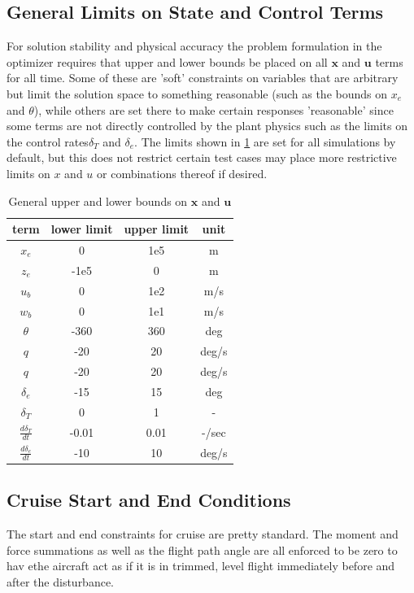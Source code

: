 \documentclass{article}
\begin{document}
\subsection{General Limits on State and Control Terms} \label{sec:limits}
For solution stability and physical accuracy the problem formulation in the optimizer requires that upper and lower bounds be placed on all  $\mathbf{x}$ and $\mathbf{u}$ terms for all time. 
Some of these are 'soft' constraints on variables that are arbitrary but limit the solution space to something reasonable (such as the bounds on $x_e$ and $\theta$),  while others are set there to make certain responses 'reasonable' since some terms are not directly controlled by the plant physics such as the limits on the control rates$\delta_T$ and $\delta_e$. 
The limits shown in \cref{tbl:general-control-limits} are set for all simulations by default, but this does not restrict certain test cases may place more restrictive limits on $x$ and $u$ or combinations thereof if desired. 
\begin{table}[!h]
	\centering
	\caption{General upper and lower bounds on $\mathbf{x}$ and $\mathbf{u}$}
	\begin{tabular}{||c||c|c|c|}
		\hline
		term & lower limit & upper limit & unit\\
		\hline
		$x_e$ & 0 & 1e5 & m\\
		\hline
		$z_e$ & -1e5 & 0 &m\\
		\hline
		$u_b$ & 0 & 1e2& m/s\\
		\hline
		$w_b$ & 0 & 1e1 & m/s\\
		\hline
		$\theta$ & -360 & 360 & deg\\
		\hline
		$q$ & -20 & 20 & deg/s \\
		\hline
		$q$ & -20 & 20 & deg/s \\
		\hline
		$\delta_e$ & -15 & 15 & deg \\
		\hline
		$\delta_T$ & 0 & 1 & - \\ 
		\hline
		$\frac{d\delta_T}{dt}$ & -0.01 & 0.01 & -/sec \\ 
		\hline
		$\frac{d\delta_e}{dt}$ & -10 & 10 & deg/s \\ 
		\hline
	\end{tabular}
	\label{tbl:general-control-limits}
\end{table}
\subsection{Cruise Start and End Conditions}
The start and end constraints for cruise are pretty standard. 
The moment and force summations as well as the flight path angle are all enforced to be zero to hav ethe aircraft act as if it is in trimmed, level flight immediately before and after the disturbance. 
\end{document}
